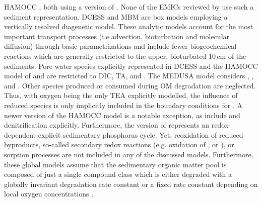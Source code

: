 \documentclass[gmd, manuscript]{copernicus}
\begin{document}
HAMOCC \citep{palastanga_long_term_2011, ilyina_global_2013}, both using a version of \citet{heinze_global_1999}. None of the EMICs reviewed by \citet{hulse_understanding_2017} use such a sediment representation. 
DCESS \citep{shaffer_presentation_2008} and MBM \citep{munhoven_glacialinterglacial_2007} are box models employing a vertically resolved diagenetic model. These analytic models account for the most important transport processes 
(i.e advection, bioturbation and molecular diffusion) through basic parametrizations and include fewer biogeochemical reactions which are generally restricted to the upper, bioturbated 10\,cm of the sediments. 
Pore water species explicitly represented in DCESS \citep{shaffer_presentation_2008} and the HAMOCC model of \citet{heinze_global_1999} and \citet{palastanga_long_term_2011} 
are restricted to DIC, TA,  and . The MEDUSA model \citep{munhoven_glacialinterglacial_2007} considers , ,  and . 
Other species produced or consumed during OM degradation are neglected. 
Thus, with oxygen being the only TEA explicitly modelled, the influence of reduced species is only implicitly included in the boundary conditions for . 
A newer version of the HAMOCC model is a notable exception, as \citet{ilyina_global_2013} include  and denitrification explicitly. Furthermore, the version of 
\citet{palastanga_long_term_2011} represents an redox-dependent explicit sedimentary phosphorus cycle. Yet, reoxidation of reduced byproducts, so-called secondary redox reactions (e.g. oxidation of ,  or ), 
or sorption processes are not included in any of the discussed models. 
Furthermore, these global models assume that the sedimentary organic matter pool is composed of just a single compound class which is either degraded with a globally invariant degradation rate constant 
\citep[][]{munhoven_glacialinterglacial_2007} or a fixed rate constant depending on local oxygen concentrations \citep{shaffer_presentation_2008, palastanga_long_term_2011}. 


\end{document}
